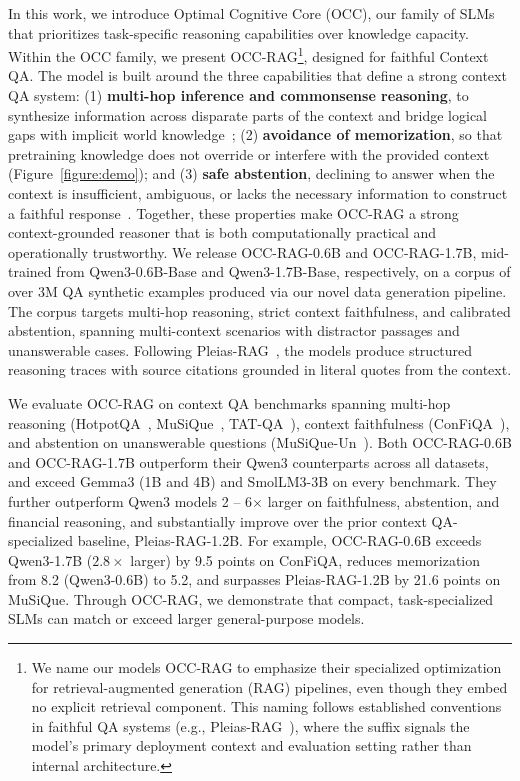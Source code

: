 \documentclass{llmxive}
\begin{document}
In this work, we introduce Optimal Cognitive Core (OCC), our family of SLMs that prioritizes task-specific reasoning capabilities over knowledge capacity. Within the OCC family, we present OCC-RAG\footnote{We name our models OCC-RAG to emphasize their specialized optimization for retrieval-augmented generation (RAG) pipelines, even though they embed no explicit retrieval component. This naming follows established conventions in faithful QA systems (e.g., Pleias-RAG~\citep{pleias}), where the suffix signals the model's primary deployment context and evaluation setting rather than internal architecture.}, designed for faithful Context QA. The model is built around the three capabilities that define a strong context QA system: (1) \textbf{multi-hop inference and commonsense reasoning}, to synthesize information across disparate parts of the context and bridge logical gaps with implicit world knowledge~\citep{yu2023naturallanguagereasoningsurvey}; (2) \textbf{avoidance of memorization}, so that pretraining knowledge does not override or interfere with the provided context~\citep{ghosh2024quantifying} (Figure~\ref{figure:demo}); and (3) \textbf{safe abstention}, declining to answer when the context is insufficient, ambiguous, or lacks the necessary information to construct a faithful response~\citep{kirichenko2026abstentionbench}. Together, these properties make OCC-RAG a strong context-grounded reasoner that is both computationally practical and operationally trustworthy. We release OCC-RAG-0.6B and OCC-RAG-1.7B, mid-trained from Qwen3-0.6B-Base and Qwen3-1.7B-Base, respectively, on a corpus of over 3M QA synthetic examples produced via our novel data generation pipeline. The corpus targets multi-hop reasoning, strict context faithfulness, and calibrated abstention, spanning multi-context scenarios with distractor passages and unanswerable cases. Following Pleias-RAG~\citep{pleias}, the models produce structured reasoning traces with source citations grounded in literal quotes from the context. 

We evaluate OCC-RAG on context QA benchmarks spanning multi-hop reasoning (HotpotQA~\citep{hotpotqa}, MuSiQue~\citep{musique}, TAT-QA~\citep{tat-qa}), context faithfulness (ConFiQA~\citep{bi-etal-2025-context}), and abstention on unanswerable questions (MuSiQue-Un~\cite{musique}). Both OCC-RAG-0.6B and OCC-RAG-1.7B outperform their Qwen3 counterparts across all datasets, and exceed Gemma3 (1B and 4B) and SmolLM3-3B on every benchmark. They further outperform Qwen3 models 2 -- 6$\times$ larger on faithfulness, abstention, and financial reasoning, and substantially improve over the prior context QA-specialized baseline, Pleias-RAG-1.2B. For example, OCC-RAG-0.6B exceeds Qwen3-1.7B ($2.8\times$ larger) by 9.5 points on ConFiQA, reduces memorization from 8.2 (Qwen3-0.6B) to 5.2, and surpasses Pleias-RAG-1.2B by 21.6 points on MuSiQue. Through OCC-RAG, we demonstrate that compact, task-specialized SLMs can match or exceed larger general-purpose models.
\end{document}
